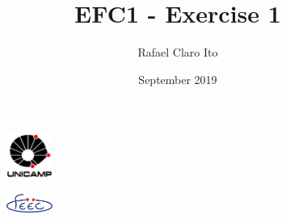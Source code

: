 \documentclass[a4paper]{article}
\begin{document}
\begin{figure}[t]
    \centering
    \includegraphics[width=1.5cm]{unicamp}
    \label{fig:unicamp}
\end{figure}

\begin{figure}[t]
    \centering
    \includegraphics[width=1.5cm]{feec}
    \label{fig:feec}
\end{figure}

\title{EFC1 - Exercise 1}
\author{Rafael Claro Ito}
\date{September 2019}
\maketitle
\newpage




%
%
%


\end{document}
